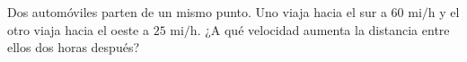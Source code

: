 \item Dos automóviles parten de un mismo punto. Uno viaja hacia el sur a $60 \text{ mi/h}$ y el otro viaja hacia el oeste a $25 \text{ mi/h}$. ¿A qué velocidad aumenta la distancia entre ellos dos horas después?
